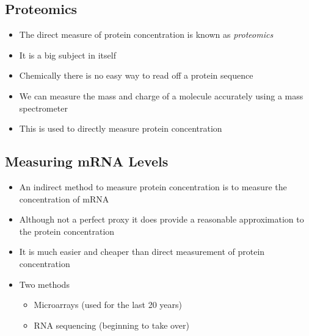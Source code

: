 
\begin{slide}
\section{Proteomics}

\begin{PauseHighLight}
  \begin{itemize}
  \item The direct measure of protein concentration is known as
    \emph{proteomics}\pause
  \item It is a big subject in itself\pause
  \item Chemically there is no easy way to read off a protein
    sequence\pause
  \item We can measure the mass and charge of a molecule accurately
    using a mass spectrometer\pause
  \item This is used to directly measure protein concentration\pause
  \end{itemize}
\end{PauseHighLight}

\end{slide}


\begin{slide}
\section{Measuring mRNA Levels}

\begin{PauseHighLight}
  \begin{itemize}
  \item An indirect method to measure protein concentration is to measure
    the concentration of mRNA\pause
  \item Although not a perfect proxy it does provide a reasonable
    approximation to the protein concentration\pause
  \item It is much easier and cheaper than direct measurement of protein
    concentration\pause
  \item Two methods
    \begin{itemize}
    \item Microarrays (used for the last 20 years)\pause
    \item RNA sequencing (beginning to take over)\pause
    \end{itemize}
  \end{itemize}
\end{PauseHighLight}

\end{slide}

